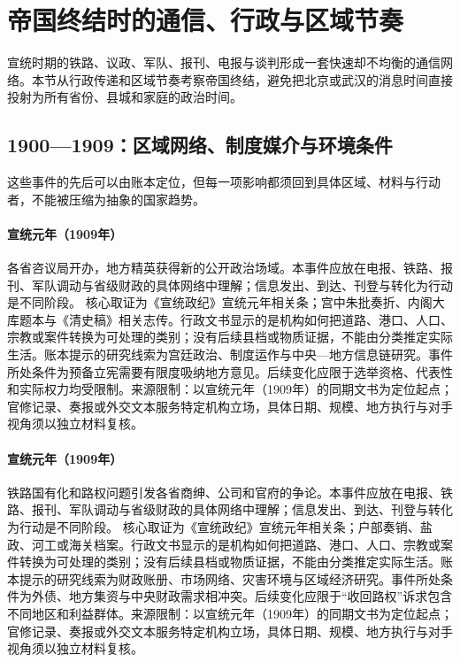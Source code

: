\section{帝国终结时的通信、行政与区域节奏}
宣统时期的铁路、议政、军队、报刊、电报与谈判形成一套快速却不均衡的通信网络。本节从行政传递和区域节奏考察帝国终结，避免把北京或武汉的消息时间直接投射为所有省份、县城和家庭的政治时间。
\subsection{1900—1909：区域网络、制度媒介与环境条件}
这些事件的先后可以由账本定位，但每一项影响都须回到具体区域、材料与行动者，不能被压缩为抽象的国家趋势。
\hypertarget{civic:EQ-1909-PROVINCIAL-ASSEMBLIES}{}\paragraph{宣统元年（1909年）}各省咨议局开办，地方精英获得新的公开政治场域。本事件应放在电报、铁路、报刊、军队调动与省级财政的具体网络中理解；信息发出、到达、刊登与转化为行动是不同阶段。 核心取证为《宣统政纪》宣统元年相关条；宫中朱批奏折、内阁大库题本与《清史稿》相关志传。行政文书显示的是机构如何把道路、港口、人口、宗教或案件转换为可处理的类别；没有后续县档或物质证据，不能由分类推定实际生活。账本提示的研究线索为宫廷政治、制度运作与中央—地方信息链研究。事件所处条件为预备立宪需要有限度吸纳地方意见。后续变化应限于选举资格、代表性和实际权力均受限制。来源限制：以宣统元年（1909年）的同期文书为定位起点；官修记录、奏报或外交文本服务特定机构立场，具体日期、规模、地方执行与对手视角须以独立材料复核。
\hypertarget{civic:EQ-1909-RAILWAY-RECOVERY-MOVEMENT}{}\paragraph{宣统元年（1909年）}铁路国有化和路权问题引发各省商绅、公司和官府的争论。本事件应放在电报、铁路、报刊、军队调动与省级财政的具体网络中理解；信息发出、到达、刊登与转化为行动是不同阶段。 核心取证为《宣统政纪》宣统元年相关条；户部奏销、盐政、河工或海关档案。行政文书显示的是机构如何把道路、港口、人口、宗教或案件转换为可处理的类别；没有后续县档或物质证据，不能由分类推定实际生活。账本提示的研究线索为财政账册、市场网络、灾害环境与区域经济研究。事件所处条件为外债、地方集资与中央财政需求相冲突。后续变化应限于“收回路权”诉求包含不同地区和利益群体。来源限制：以宣统元年（1909年）的同期文书为定位起点；官修记录、奏报或外交文本服务特定机构立场，具体日期、规模、地方执行与对手视角须以独立材料复核。
